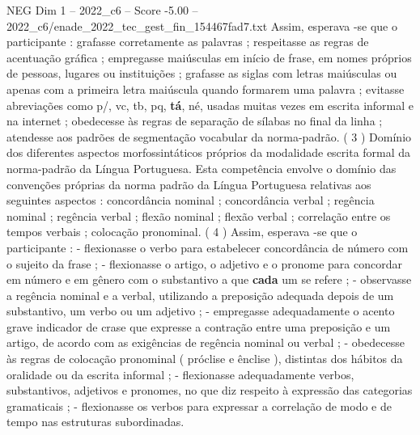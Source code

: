\begin{textsample}{NEG Dim 1 – 2022\_c6 – Score -5.00 – 2022\_c6/enade\_2022\_tec\_gest\_fin\_154467fad7.txt}
Assim, esperava -se que o participante : grafasse corretamente as palavras ; respeitasse as regras de acentuação gráfica ; empregasse maiúsculas em início de frase, em nomes próprios de pessoas, lugares ou instituições ; grafasse as siglas com letras maiúsculas ou apenas com a primeira letra maiúscula quando formarem uma palavra ; evitasse abreviações como p/, vc, tb, pq, \textbf{tá}, né, usadas muitas vezes em escrita informal e na internet ; obedecesse às regras de separação de sílabas no final da linha ; atendesse aos padrões de segmentação vocabular da norma-padrão. ( 3 ) Domínio dos diferentes aspectos morfossintáticos próprios da modalidade escrita formal da norma-padrão da Língua Portuguesa.
Esta competência envolve o domínio das convenções próprias da norma padrão da Língua Portuguesa relativas aos seguintes aspectos : concordância nominal ; concordância verbal ; regência nominal ; regência verbal ; flexão nominal ; flexão verbal ; correlação entre os tempos verbais ; colocação pronominal. ( 4 ) Assim, esperava -se que o participante : - flexionasse o verbo para estabelecer concordância de número com o sujeito da frase ; - flexionasse o artigo, o adjetivo e o pronome para concordar em número e em gênero com o substantivo a que \textbf{cada} um se refere ; - observasse a regência nominal e a verbal, utilizando a preposição adequada depois de um substantivo, um verbo ou um adjetivo ; - empregasse adequadamente o acento grave indicador de crase que expresse a contração entre uma preposição e um artigo, de acordo com as exigências de regência nominal ou verbal ; - obedecesse às regras de colocação pronominal ( próclise e ênclise ), distintas dos hábitos da oralidade ou da escrita informal ; - flexionasse adequadamente verbos, substantivos, adjetivos e pronomes, no que diz respeito à expressão das categorias gramaticais ; - flexionasse os verbos para expressar a correlação de modo e de tempo nas estruturas subordinadas.

\end{textsample}
